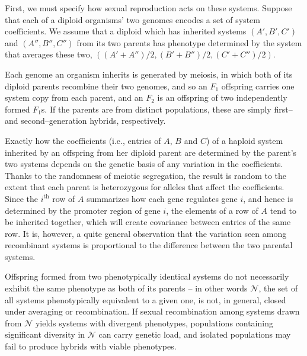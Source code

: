 \documentclass{article}
\newcommand{\1}{\mathbbm{1}}
\newcommand{\allS}{\mathcal{N}}
\begin{document}
First, we must specify how sexual reproduction acts on these systems.
Suppose that each of a diploid organisms' two genomes encodes a set of system coefficients.
We assume that a diploid which has inherited systems $(A', B', C')$ and $(A'', B'', C'')$ from its two parents
has phenotype determined by the system that averages these two,
$((A'+A'')/2, (B'+B'')/2, (C'+C'')/2)$.

Each genome an organism inherits is generated by meiosis,
in which both of its diploid parents recombine their two genomes,
and so an $F_1$ offspring carries one system copy from each parent,
and an $F_2$ is an offspring of two independently formed $F_1$s.
If the parents are from distinct populations,
these are simply first-- and second--generation hybrids, respectively.

Exactly how the coefficients 
(i.e., entries of $A$, $B$ and $C$)
of a haploid system inherited by an offspring from her diploid parent
are determined by the parent's two systems
depends on the genetic basis of any variation in the coefficients.
Thanks to the randomness of meiotic segregation,
the result is random to the extent that each parent is heterozygous
for alleles that affect the coefficients.
Since the $i^\text{th}$ row of $A$ summarizes how each gene regulates gene $i$,
and hence is determined by the promoter region of gene $i$,
the elements of a row of $A$ tend to be inherited together,
which will create covariance between entries of the same row.
It is, however, a quite general observation that the variation seen among recombinant systems
is proportional to the difference between the two parental systems.

Offspring formed from two phenotypically identical systems do not necessarily exhibit the same phenotype as both of its parents 
-- in other words $\allS$, the set of all systems phenotypically equivalent to a given one, is not, in general, closed under averaging or recombination.
If sexual recombination among systems drawn from $\allS$ yields systems with divergent phenotypes, 
populations containing significant diversity in $\allS$ can carry genetic load, and isolated populations may fail to produce hybrids with viable phenotypes.
\end{document}
